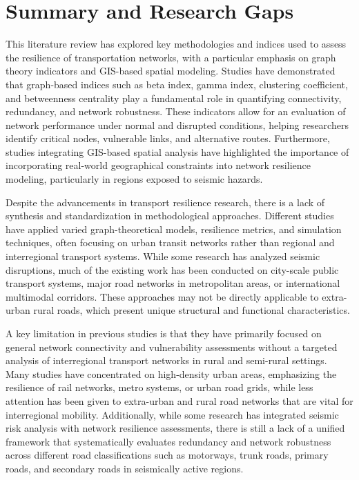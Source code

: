 \section{Summary and Research Gaps}

This literature review has explored key methodologies and indices used to assess the resilience of transportation networks, with a particular emphasis on graph theory indicators and GIS-based spatial modeling. Studies have demonstrated that graph-based indices such as beta index, gamma index, clustering coefficient, and betweenness centrality play a fundamental role in quantifying connectivity, redundancy, and network robustness. These indicators allow for an evaluation of network performance under normal and disrupted conditions, helping researchers identify critical nodes, vulnerable links, and alternative routes. Furthermore, studies integrating GIS-based spatial analysis have highlighted the importance of incorporating real-world geographical constraints into network resilience modeling, particularly in regions exposed to seismic hazards.

Despite the advancements in transport resilience research, there is a lack of synthesis and standardization in methodological approaches. Different studies have applied varied graph-theoretical models, resilience metrics, and simulation techniques, often focusing on urban transit networks rather than regional and interregional transport systems. While some research has analyzed seismic disruptions, much of the existing work has been conducted on city-scale public transport systems, major road networks in metropolitan areas, or international multimodal corridors. These approaches may not be directly applicable to extra-urban rural roads, which present unique structural and functional characteristics.

A key limitation in previous studies is that they have primarily focused on general network connectivity and vulnerability assessments without a targeted analysis of interregional transport networks in rural and semi-rural settings. Many studies have concentrated on high-density urban areas, emphasizing the resilience of rail networks, metro systems, or urban road grids, while less attention has been given to extra-urban and rural road networks that are vital for interregional mobility. Additionally, while some research has integrated seismic risk analysis with network resilience assessments, there is still a lack of a unified framework that systematically evaluates redundancy and network robustness across different road classifications such as motorways, trunk roads, primary roads, and secondary roads in seismically active regions.

